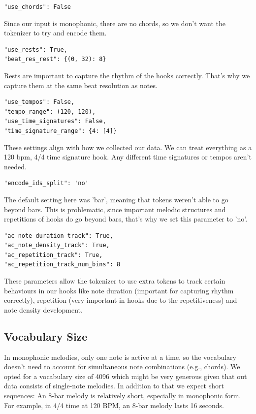\documentclass[a4paper,12pt]{extarticle}
\begin{document}
\begin{lstlisting}
"use_chords": False
\end{lstlisting}
Since our input is monophonic, there are no chords, so we don't want the tokenizer to try and encode them. \newline

\begin{lstlisting}
"use_rests": True,
"beat_res_rest": {(0, 32): 8}
\end{lstlisting}
Rests are important to capture the rhythm of the hooks correctly. That's why we capture them at the same beat resolution as notes. \newline

\begin{lstlisting}
"use_tempos": False,
"tempo_range": (120, 120),
"use_time_signatures": False,
"time_signature_range": {4: [4]}
\end{lstlisting}
These settings align with how we collected our data. We can treat everything as a 120 bpm, 4/4 time signature hook. Any different time signatures or tempos aren't needed. \newline

\begin{lstlisting}
"encode_ids_split": 'no'
\end{lstlisting}
The default setting here was 'bar', meaning that tokens weren't able to go beyond bars. This is problematic, since important melodic structures and repetitions of hooks do go beyond bars, that's why we set this parameter to 'no'. \newline

\begin{lstlisting}
"ac_note_duration_track": True,
"ac_note_density_track": True,
"ac_repetition_track": True,
"ac_repetition_track_num_bins": 8
\end{lstlisting}
These parameters allow the tokenizer to use extra tokens to track certain behaviours in our hooks like note duration (important for capturing rhythm correctly), repetition (very important in hooks due to the repetitiveness) and note density development.
\subsection{Vocabulary Size}
In monophonic melodies, only one note is active at a time, so the vocabulary doesn’t need to account for simultaneous note combinations (e.g., chords).
We opted for a vocabulary size of 4096 which might be very generous given that out data consists of single-note melodies.
In addition to that we expect short sequences: An 8-bar melody is relatively short, especially in monophonic form. For example, in 4/4 time at 120 BPM, an 8-bar melody lasts 16 seconds.
\end{document}
